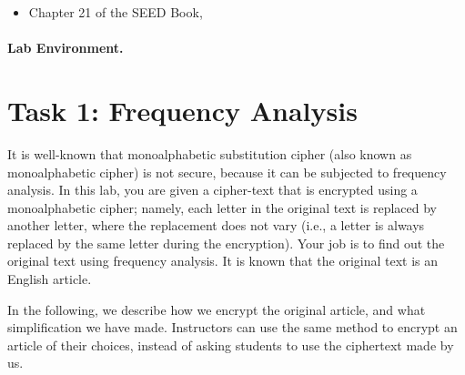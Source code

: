 \begin{itemize}
\item Chapter 21 of the SEED Book, \seedbook
\end{itemize}


\paragraph{Lab Environment.} \seedenvironment




\section{Task 1: Frequency Analysis}

It is well-known that monoalphabetic substitution cipher (also known as monoalphabetic cipher) 
is not secure, because it can be subjected to frequency analysis. In this lab, you are given 
a cipher-text that is encrypted using a monoalphabetic cipher; namely,
each letter in the original text is replaced by another letter, 
where the replacement does not vary (i.e., a letter is always replaced by the same letter
during the encryption). Your job is to find out the original text using 
frequency analysis. It is known that the original text is an English article. 


In the following, we describe how we encrypt the original article, and what 
simplification we have made. Instructors can use the same
method to encrypt an article of their choices, instead of asking 
students to use the ciphertext made by us.

